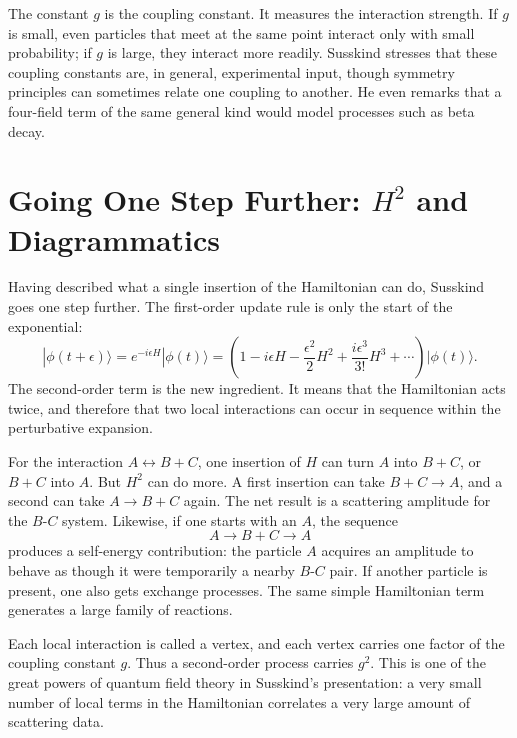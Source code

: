 The constant \(g\) is the coupling constant. It measures the interaction strength. If \(g\) is small, even particles that meet at the same point interact only with small probability; if \(g\) is large, they interact more readily. Susskind stresses that these coupling constants are, in general, experimental input, though symmetry principles can sometimes relate one coupling to another. He even remarks that a four-field term of the same general kind would model processes such as beta decay.

\section{Going One Step Further: \texorpdfstring{\(H^2\)}{H^2} and Diagrammatics}

Having described what a single insertion of the Hamiltonian can do, Susskind goes one step further. The first-order update rule is only the start of the exponential:
\begin{equation}
|\phi(t+\epsilon)\rangle
=
e^{-i\epsilon H}|\phi(t)\rangle
=
\left(
1-i\epsilon H-\frac{\epsilon^2}{2}H^2+\frac{i\epsilon^3}{3!}H^3+\cdots
\right)|\phi(t)\rangle.
\end{equation}
The second-order term is the new ingredient. It means that the Hamiltonian acts twice, and therefore that two local interactions can occur in sequence within the perturbative expansion.

For the interaction \(A\leftrightarrow B+C\), one insertion of \(H\) can turn \(A\) into \(B+C\), or \(B+C\) into \(A\). But \(H^2\) can do more. A first insertion can take \(B+C\to A\), and a second can take \(A\to B+C\) again. The net result is a scattering amplitude for the \(B\)-\(C\) system. Likewise, if one starts with an \(A\), the sequence
\begin{equation}
A\longrightarrow B+C\longrightarrow A
\end{equation}
produces a self-energy contribution: the particle \(A\) acquires an amplitude to behave as though it were temporarily a nearby \(B\)-\(C\) pair. If another particle is present, one also gets exchange processes. The same simple Hamiltonian term generates a large family of reactions.

Each local interaction is called a vertex, and each vertex carries one factor of the coupling constant \(g\). Thus a second-order process carries \(g^2\). This is one of the great powers of quantum field theory in Susskind's presentation: a very small number of local terms in the Hamiltonian correlates a very large amount of scattering data.

